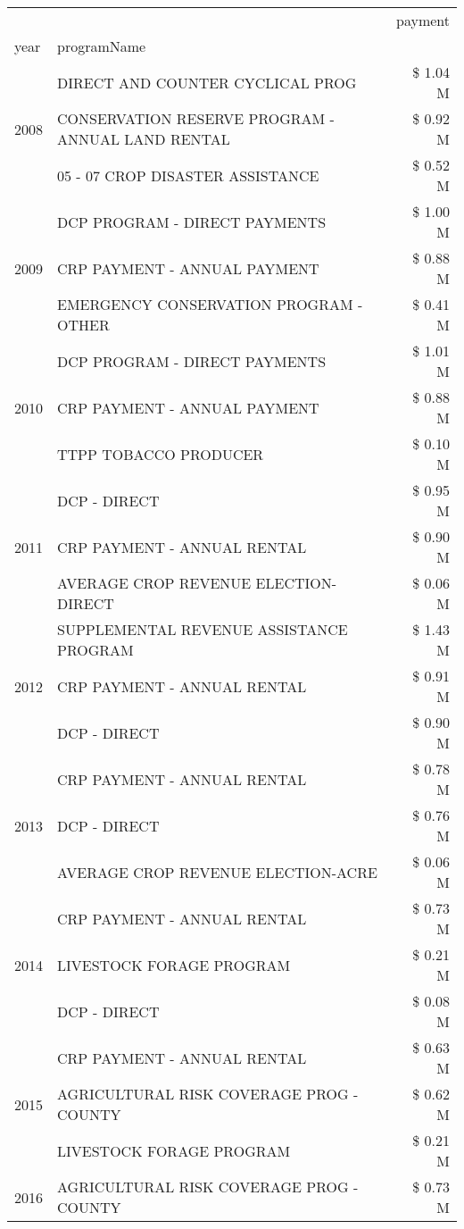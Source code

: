 \begin{tabular}{llr}
\toprule
 &  & payment \\
year & programName &  \\
\midrule
\multirow[t]{3}{*}{2008} & DIRECT AND COUNTER CYCLICAL PROG & \$ 1.04 M \\
 & CONSERVATION RESERVE PROGRAM - ANNUAL LAND RENTAL & \$ 0.92 M \\
 & 05 - 07 CROP DISASTER ASSISTANCE & \$ 0.52 M \\
\cline{1-3}
\multirow[t]{3}{*}{2009} & DCP PROGRAM - DIRECT PAYMENTS & \$ 1.00 M \\
 & CRP PAYMENT - ANNUAL PAYMENT & \$ 0.88 M \\
 & EMERGENCY CONSERVATION PROGRAM - OTHER & \$ 0.41 M \\
\cline{1-3}
\multirow[t]{3}{*}{2010} & DCP PROGRAM - DIRECT PAYMENTS & \$ 1.01 M \\
 & CRP PAYMENT - ANNUAL PAYMENT & \$ 0.88 M \\
 & TTPP TOBACCO PRODUCER & \$ 0.10 M \\
\cline{1-3}
\multirow[t]{3}{*}{2011} & DCP - DIRECT & \$ 0.95 M \\
 & CRP PAYMENT - ANNUAL RENTAL & \$ 0.90 M \\
 & AVERAGE CROP REVENUE ELECTION-DIRECT & \$ 0.06 M \\
\cline{1-3}
\multirow[t]{3}{*}{2012} & SUPPLEMENTAL REVENUE ASSISTANCE PROGRAM & \$ 1.43 M \\
 & CRP PAYMENT - ANNUAL RENTAL & \$ 0.91 M \\
 & DCP - DIRECT & \$ 0.90 M \\
\cline{1-3}
\multirow[t]{3}{*}{2013} & CRP PAYMENT - ANNUAL RENTAL & \$ 0.78 M \\
 & DCP - DIRECT & \$ 0.76 M \\
 & AVERAGE CROP REVENUE ELECTION-ACRE & \$ 0.06 M \\
\cline{1-3}
\multirow[t]{3}{*}{2014} & CRP PAYMENT - ANNUAL RENTAL & \$ 0.73 M \\
 & LIVESTOCK FORAGE PROGRAM & \$ 0.21 M \\
 & DCP - DIRECT & \$ 0.08 M \\
\cline{1-3}
\multirow[t]{3}{*}{2015} & CRP PAYMENT - ANNUAL RENTAL & \$ 0.63 M \\
 & AGRICULTURAL RISK COVERAGE PROG - COUNTY & \$ 0.62 M \\
 & LIVESTOCK FORAGE PROGRAM & \$ 0.21 M \\
\cline{1-3}
\multirow[t]{3}{*}{2016} & AGRICULTURAL RISK COVERAGE PROG - COUNTY & \$ 0.73 M \\

\end{tabular}
